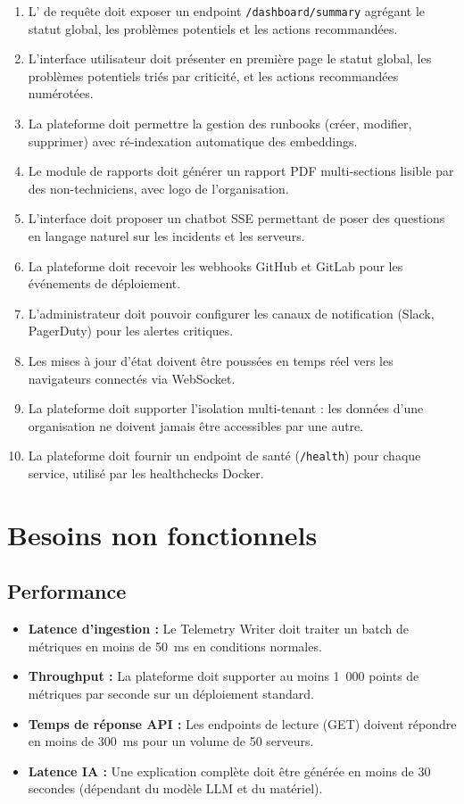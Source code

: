 \begin{enumerate}[label=\textbf{BF\arabic*}, leftmargin=2.2cm, itemsep=4pt]
    (même serveur, même métrique, même détecteur) répétées dans les 15 minutes.
  \item L'\api{} de requête doit exposer un endpoint \texttt{/dashboard/summary}
    agrégant le statut global, les problèmes potentiels et les actions recommandées.
  \item L'interface utilisateur doit présenter en première page le statut global,
    les problèmes potentiels triés par criticité, et les actions recommandées
    numérotées.
  \item La plateforme doit permettre la gestion des runbooks (créer, modifier,
    supprimer) avec ré-indexation automatique des embeddings.
  \item Le module de rapports doit générer un rapport PDF multi-sections lisible
    par des non-techniciens, avec logo de l'organisation.
  \item L'interface doit proposer un chatbot SSE permettant de poser des questions
    en langage naturel sur les incidents et les serveurs.
  \item La plateforme doit recevoir les webhooks GitHub et GitLab pour les
    événements de déploiement.
  \item L'administrateur doit pouvoir configurer les canaux de notification
    (Slack, PagerDuty) pour les alertes critiques.
  \item Les mises à jour d'état doivent être poussées en temps réel vers les
    navigateurs connectés via WebSocket.
  \item La plateforme doit supporter l'isolation multi-tenant : les données d'une
    organisation ne doivent jamais être accessibles par une autre.
  \item La plateforme doit fournir un endpoint de santé (\texttt{/health}) pour
    chaque service, utilisé par les healthchecks Docker.
\end{enumerate}

\section{Besoins non fonctionnels}

\subsection{Performance}

\begin{itemize}
  \item \textbf{Latence d'ingestion :} Le Telemetry Writer doit traiter un batch
    de métriques en moins de 50~ms en conditions normales.
  \item \textbf{Throughput :} La plateforme doit supporter au moins 1~000 points
    de métriques par seconde sur un déploiement standard.
  \item \textbf{Temps de réponse API :} Les endpoints de lecture (GET) doivent
    répondre en moins de 300~ms pour un volume de 50 serveurs.
  \item \textbf{Latence IA :} Une explication complète doit être générée en moins
    de 30 secondes (dépendant du modèle LLM et du matériel).
\end{itemize}


